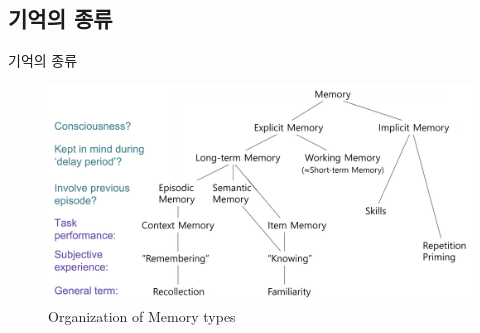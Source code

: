\documentclass{beamer}
\begin{document}
\subsection{기억의 종류}
\begin{frame}{기억의 종류}

  \begin{figure}
    \centering
    \includegraphics[width=\textwidth]{image/memory_tree_2}
    \caption{Organization of Memory types}
  \end{figure}


\end{frame}
\end{document}
